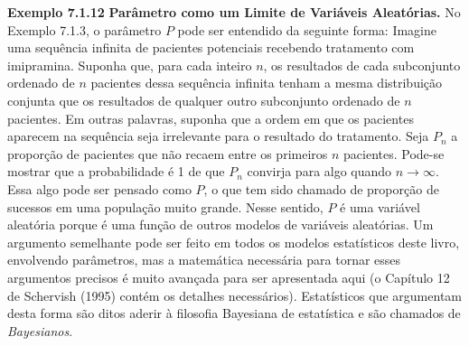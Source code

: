 \vspace{1cm}
\noindent\textbf{Exemplo 7.1.12} \quad \textbf{Parâmetro como um Limite de Variáveis Aleatórias.} No Exemplo 7.1.3, o parâmetro $P$ pode ser entendido da seguinte forma: Imagine uma sequência infinita de pacientes potenciais recebendo tratamento com imipramina. Suponha que, para cada inteiro $n$, os resultados de cada subconjunto ordenado de $n$ pacientes dessa sequência infinita tenham a mesma distribuição conjunta que os resultados de qualquer outro subconjunto ordenado de $n$ pacientes. Em outras palavras, suponha que a ordem em que os pacientes aparecem na sequência seja irrelevante para o resultado do tratamento. Seja $P_n$ a proporção de pacientes que não recaem entre os primeiros $n$ pacientes. Pode-se mostrar que a probabilidade é 1 de que $P_n$ convirja para algo quando $n \to \infty$. Essa algo pode ser pensado como $P$, o que tem sido chamado de proporção de sucessos em uma população muito grande. Nesse sentido, $P$ é uma variável aleatória porque é uma função de outros modelos de variáveis aleatórias. Um argumento semelhante pode ser feito em todos os modelos estatísticos deste livro, envolvendo parâmetros, mas a matemática necessária para tornar esses argumentos precisos é muito avançada para ser apresentada aqui (o Capítulo 12 de Schervish (1995) contém os detalhes necessários). Estatísticos que argumentam desta forma são ditos aderir à filosofia Bayesiana de estatística e são chamados de \textit{Bayesianos}.

